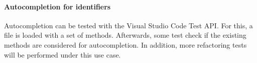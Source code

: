 \paragraph{Autocompletion for identifiers}
Autocompletion can be tested with the Visual Studio Code Test API. For this, a file is loaded with a set of methods. Afterwards, some test check if the existing methods are considered for autocompletion. In addition, more refactoring tests will be performed under this use case. 
